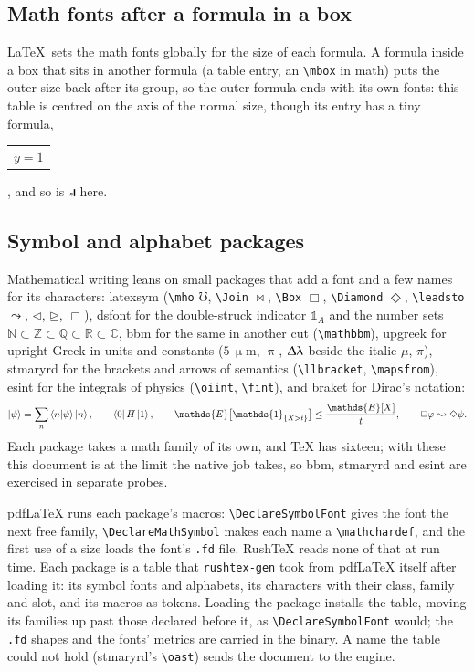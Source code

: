 \documentclass{article}
\numberwithin{equation}{section}
\theoremstyle{definition}
\theoremstyle{remark}
\begin{document}
\subsection{Math fonts after a formula in a box}\label{sec:restglb}
\LaTeX\ sets the math fonts globally for the size of each formula. A formula inside a box
that sits in another formula (a table entry, an \verb|\mbox| in math) puts the outer size
back after its group, so the outer formula ends with its own fonts: this table is centred
on the axis of the normal size, though its entry has a tiny formula,
\begin{tabular}{c}{\tiny $y=1$}\end{tabular}, and so is
$\mbox{\tiny $z$}\vcenter{\hrule height 6pt width 1pt}$ here.

\subsection{Symbol and alphabet packages}\label{sec:mathpkgs}

Mathematical writing leans on small packages that add a font and a few names for its
characters: latexsym (\verb|\mho| $\mho$, \verb|\Join| $\Join$, \verb|\Box| $\Box$,
\verb|\Diamond| $\Diamond$, \verb|\leadsto| $\leadsto$, $\lhd$, $\unrhd$, $\sqsubset$), dsfont
for the double-struck indicator $\mathds{1}_A$ and the number sets $\mathds{N}\subset
\mathds{Z}\subset\mathds{Q}\subset\mathds{R}\subset\mathds{C}$, bbm for the same in another
cut (\verb|\mathbbm|), upgreek for upright Greek
in units and constants ($5\,\upmu\mathrm{m}$, $\uppi$, $\Updelta\uplambda$ beside the italic
$\mu$, $\pi$), stmaryrd for the brackets and arrows of semantics (\verb|\llbracket|,
\verb|\mapsfrom|), esint for the integrals of physics (\verb|\oiint|, \verb|\fint|), and
braket for Dirac's notation:
\[ \ket{\psi} = \sum_n \braket{n|\psi}\ket{n}, \qquad \bra{0}H\ket{1}, \qquad
   \mathds{E}\bigl[\mathds{1}_{\{X>t\}}\bigr] \le \frac{\mathds{E}[X]}{t},
   \qquad \Box\varphi\leadsto\Diamond\psi . \]
Each package takes a math family of its own, and \TeX{} has sixteen; with these this
document is at the limit the native job takes, so bbm, stmaryrd and esint are exercised in
separate probes.

pdfLaTeX runs each package's macros: \verb|\DeclareSymbolFont| gives the font the next free
family, \verb|\DeclareMathSymbol| makes each name a \verb|\mathchardef|, and the first use of
a size loads the font's \texttt{.fd} file. RushTeX reads none of that at run time. Each
package is a table that \texttt{rushtex-gen} took from pdfLaTeX itself after loading it:
its symbol fonts and alphabets, its characters with their class, family and slot, and its
macros as tokens. Loading the package installs the table, moving its families up past
those declared before it, as \verb|\DeclareSymbolFont| would; the \texttt{.fd} shapes and
the fonts' metrics are carried in the binary. A name the table could not hold (stmaryrd's
\verb|\oast|) sends the document to the engine.
\end{document}
